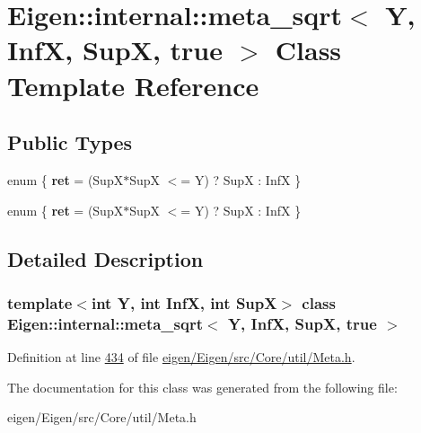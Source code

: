 \hypertarget{class_eigen_1_1internal_1_1meta__sqrt_3_01_y_00_01_inf_x_00_01_sup_x_00_01true_01_4}{}\section{Eigen\+:\+:internal\+:\+:meta\+\_\+sqrt$<$ Y, InfX, SupX, true $>$ Class Template Reference}
\label{class_eigen_1_1internal_1_1meta__sqrt_3_01_y_00_01_inf_x_00_01_sup_x_00_01true_01_4}
\subsection*{Public Types}
\begin{DoxyCompactItemize}
\item 
\mbox{\label{class_eigen_1_1internal_1_1meta__sqrt_3_01_y_00_01_inf_x_00_01_sup_x_00_01true_01_4_a45806b1c1db18e7d8374b66bdf6fa42e}} 
enum \{ {\bfseries ret} = (Sup\+X$\ast$\+SupX $<$= Y) ? SupX \+: InfX
 \}
\item 
\mbox{\label{class_eigen_1_1internal_1_1meta__sqrt_3_01_y_00_01_inf_x_00_01_sup_x_00_01true_01_4_aea44c7fbc11d3a58de5b37bb00156ab4}} 
enum \{ {\bfseries ret} = (Sup\+X$\ast$\+SupX $<$= Y) ? SupX \+: InfX
 \}
\end{DoxyCompactItemize}


\subsection{Detailed Description}
\subsubsection*{template$<$int Y, int InfX, int SupX$>$\newline
class Eigen\+::internal\+::meta\+\_\+sqrt$<$ Y, Inf\+X, Sup\+X, true $>$}



Definition at line \hyperlink{eigen_2_eigen_2src_2_core_2util_2_meta_8h_source_l00434}{434} of file \hyperlink{eigen_2_eigen_2src_2_core_2util_2_meta_8h_source}{eigen/\+Eigen/src/\+Core/util/\+Meta.\+h}.



The documentation for this class was generated from the following file\+:\begin{DoxyCompactItemize}
\item 
eigen/\+Eigen/src/\+Core/util/\+Meta.\+h\end{DoxyCompactItemize}
